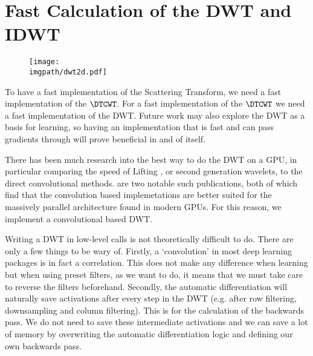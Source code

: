 
\section{Fast Calculation of the DWT and IDWT}\label{sec:ch3:dwt}
\begin{figure}
  \centering
  \texttt{[image: \\imgpath/dwt2d.pdf]}
  \label{fig:ch3:dwt}
\end{figure}

To have a fast implementation of the Scattering Transform, we need a fast
implementation of the $\DTCWT$. For a fast implementation of the $\DTCWT$ we
need a fast implementation of the DWT. Future work may also explore
the DWT as a basis for learning, so having an implementation that is fast and
can pass gradients through will prove beneficial in and of itself.

There has been much research into the best way to do the DWT on a GPU, in
particular comparing the speed of Lifting \cite{sweldens_lifting_1998}, or second
generation wavelets, to the direct convolutional methods.
\cite{tenllado_parallel_2008, galiano_improving_2011} are two notable such
publications, both of which find that the convolution based implemetations are
better suited for the massively parallel architecture found in modern GPUs. For
this reason, we implement a convolutional based DWT.

Writing a DWT in low-level calls is not theoretically difficult to do.
There are only a few things to be wary of. Firstly, a `convolution' in most deep
learning packages is in fact a correlation. This does not make any difference
when learning but when using preset filters, as we want to do, it means that we
must take care to reverse the filters beforehand. Secondly, the automatic 
differentiation will naturally save activations after every step in the DWT
(e.g. after row filtering, downsampling and column filtering). This is for the
calculation of the backwards pass. We do not need to save these intermediate
activations and we can save a lot of memory by overwriting the automatic
differentiation logic and defining our own backwards pass.

